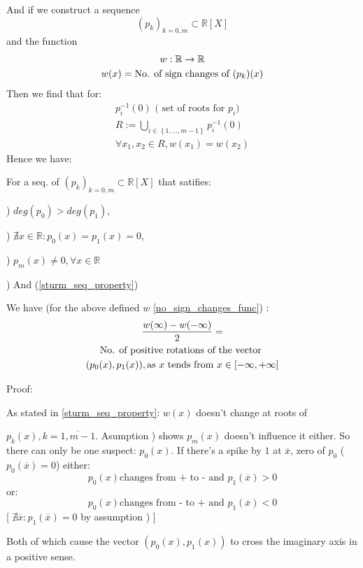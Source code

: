 And if we construct a sequence
\[
  (p_k)_{k = \overline{0,m}} \subset \mathbb{R}[X]
\]
and the function
\begin{gather}\label{no_sign_changes_func}
  w : \mathbb{R} \rightarrow \mathbb{R} \notag  \\
  w(x) = \text{No. of sign changes of  } (p_k)(x) \notag
\end{gather}
Then we find that for:
\begin{gather*}
  p_i^{-1}(0) \text{ ( set of roots for $p_i$) } \\
  R := \bigcup_{i \in \left\{ 1, \dots, m-1 \right\} } p_i^{-1}(0) \\
  \forall x_1, x_2 \in R, w(x_1) = w(x_2)
\end{gather*}
Hence we have:
\begin{lemma}\label{sturm_lemma}
  For a seq. of $  (p_k)_{k = \overline{0,m}} \subset \mathbb{R}[X]$ that satifies:

)
$ deg(p_0) > deg(p_1), $

)
$\nexists x \in \mathbb{R} : p_0(x) = p_1(x) = 0, $

)
$p_m(x) \neq 0, \forall x \in \mathbb{R}$

)
And (\ref{sturm_seq_property})
\par
We have (for the above defined $w$ \ref{no_sign_changes_func}) :
\begin{gather}
\frac{w(\infty) - w(-\infty)}{2} =  \notag \\
\text{No. of positive rotations of the vector } \notag \\
(p_0(x), p_1(x)), \text{as $x$ tends from  } x \in [-\infty, +\infty] \notag
\end{gather}
\end{lemma}

Proof:

As stated in \ref{sturm_seq_property}: $w(x)$ doesn't change at roots of

$p_k(x), k = \overline{1,m-1}$. Asumption ) shows $p_m(x)$ doesn't influence it either. So there can only be one suspect: $p_0(x)$. If there's a spike by $1$ at $\overline{x}$, zero of $p_0$ (   $p_0(\overline{x}) =0 $) either:
\[
p_0(x) \text{changes from + to - and   } p_1(\overline{x}) > 0
\]
or:
\[
p_0(x) \text{changes from - to + and  } p_1(\overline{x}) < 0
\]
[   $\nexists \overline{x}: p_1(\overline{x}) = 0$ by assumption )  ]

Both of which cause the vector $(p_0(x), p_1(x))$ to cross the imaginary axis in a positive sense.

